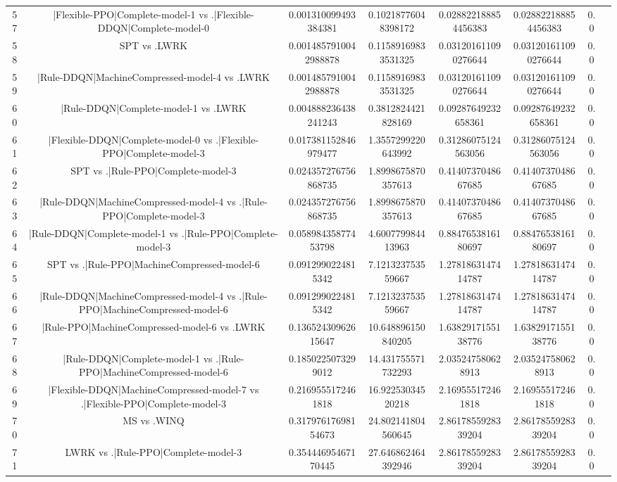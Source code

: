 \documentclass[a3paper,10pt]{article}
\begin{document}
\begin{table}[!htp]
\begin{tabular}{cccccccc}
57&|Flexible-PPO|Complete-model-1 vs .|Flexible-DDQN|Complete-model-0&0.001310099493384381&0.10218776048398172&0.028822188854456383&0.028822188854456383&0.0\\
58&SPT vs .LWRK&0.0014857910042988878&0.11589169833531325&0.031201611090276644&0.031201611090276644&0.0\\
59&|Rule-DDQN|MachineCompressed-model-4 vs .LWRK&0.0014857910042988878&0.11589169833531325&0.031201611090276644&0.031201611090276644&0.0\\
60&|Rule-DDQN|Complete-model-1 vs .LWRK&0.004888236438241243&0.3812824421828169&0.09287649232658361&0.09287649232658361&0.0\\
61&|Flexible-DDQN|Complete-model-0 vs .|Flexible-PPO|Complete-model-3&0.017381152846979477&1.3557299220643992&0.31286075124563056&0.31286075124563056&0.0\\
62&SPT vs .|Rule-PPO|Complete-model-3&0.024357276756868735&1.8998675870357613&0.4140737048667685&0.4140737048667685&0.0\\
63&|Rule-DDQN|MachineCompressed-model-4 vs .|Rule-PPO|Complete-model-3&0.024357276756868735&1.8998675870357613&0.4140737048667685&0.4140737048667685&0.0\\
64&|Rule-DDQN|Complete-model-1 vs .|Rule-PPO|Complete-model-3&0.05898435877453798&4.600779984413963&0.8847653816180697&0.8847653816180697&0.0\\
65&SPT vs .|Rule-PPO|MachineCompressed-model-6&0.0912990224815342&7.121323753559667&1.2781863147414787&1.2781863147414787&0.0\\
66&|Rule-DDQN|MachineCompressed-model-4 vs .|Rule-PPO|MachineCompressed-model-6&0.0912990224815342&7.121323753559667&1.2781863147414787&1.2781863147414787&0.0\\
67&|Rule-PPO|MachineCompressed-model-6 vs .LWRK&0.13652430962615647&10.648896150840205&1.6382917155138776&1.6382917155138776&0.0\\
68&|Rule-DDQN|Complete-model-1 vs .|Rule-PPO|MachineCompressed-model-6&0.1850225073299012&14.431755571732293&2.035247580628913&2.035247580628913&0.0\\
69&|Flexible-DDQN|MachineCompressed-model-7 vs .|Flexible-PPO|Complete-model-3&0.2169555172461818&16.92253034520218&2.169555172461818&2.169555172461818&0.0\\
70&MS vs .WINQ&0.31797617698154673&24.802141804560645&2.8617855928339204&2.8617855928339204&0.0\\
71&LWRK vs .|Rule-PPO|Complete-model-3&0.35444695467170445&27.646862464392946&2.8617855928339204&2.8617855928339204&0.0\\

\end{tabular}
\end{table}
\end{document}
